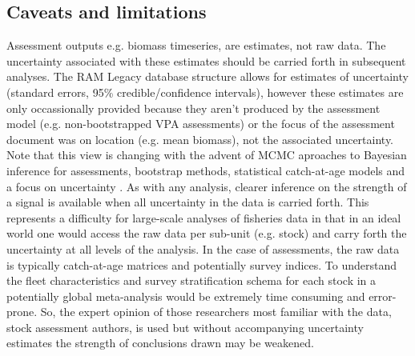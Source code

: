\documentclass[letterpaper,12pt]{article}
\begin{document}
\subsection{Caveats and limitations}
Assessment outputs e.g. biomass timeseries, are estimates, not raw data. The uncertainty associated with these estimates should be carried forth in subsequent analyses. The RAM Legacy database structure allows for estimates of uncertainty (standard errors, 95\% credible/confidence intervals), however these estimates are only occassionally provided because they aren't produced by the assessment model (e.g. non-bootstrapped VPA assessments) or the focus of the assessment document was on location (e.g. mean biomass), not the associated uncertainty. Note that this view is changing with the advent of MCMC aproaches to Bayesian inference for assessments, bootstrap methods, statistical catch-at-age models and a focus on uncertainty \citep{Walters:Maguire:1996:reviews}. As with any analysis, clearer inference on the strength of a signal is available when all uncertainty in the data is carried forth. This represents a difficulty for large-scale analyses of fisheries data in that in an ideal world one would access the raw data per sub-unit (e.g. stock) and carry forth the uncertainty at all levels of the analysis. In the case of assessments, the raw data is typically catch-at-age matrices and potentially survey indices. To understand the fleet characteristics and survey stratification schema for each stock in a potentially global meta-analysis would be extremely time consuming and error-prone. So, the expert opinion of those researchers most familiar with the data, stock assessment authors, is used but without accompanying uncertainty estimates the strength of conclusions drawn may be weakened.
\end{document}
